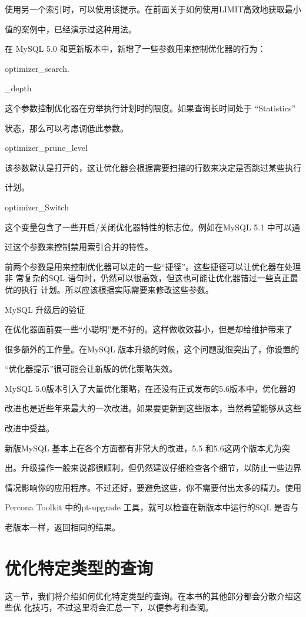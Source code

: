 使用另一个索引时，可以使用该提示。在前面关于如何使用LIMIT高效地获取最小

值的案例中，已经演示过这种用法。

在 MySQL 5.0 和更新版本中，新增了一些参数用来控制优化器的行为：

optimizer\_search.

\_depth

这个参数控制优化器在穷举执行计划时的限度。如果查询长时间处于 “Statistics”

状态，那么可以考虑调低此参数。

optimizer\_prune\_level

该参数默认是打开的，这让优化器会根据需要扫描的行数来决定是否跳过某些执行

计划。

optimizer\_Switch

这个变量包含了一些开启/关闭优化器特性的标志位。例如在MySQL 5.1 中可以通

过这个参数来控制禁用索引合并的特性。

前两个参数是用来控制优化器可以走的一些“捷径”。这些捷径可以让优化器在处理非
常复杂的SQL 语句时，仍然可以很高效，但这也可能让优化器错过一些真正最优的执行
计划。所以应该根据实际需要来修改这些参数。

MySQL 升级后的验证

在优化器面前耍一些“小聪明”是不好的。这样做收效甚小，但是却给维护带来了

很多额外的工作量。在MySQL 版本升级的时候，这个问题就很突出了，你设置的

“优化器提示”很可能会让新版的优化策略失效。

MySQL 5.0版本引入了大量优化策略，在还没有正式发布的5.6版本中，优化器的

改进也是近些年来最大的一次改进。如果要更新到这些版本，当然希望能够从这些

改进中受益。

新版MySQL 基本上在各个方面都有非常大的改进，5.5 和5.6这两个版本尤为突

出。升级操作一般来说都很顺利，但仍然建议仔细检查各个细节，以防止一些边界

情况影响你的应用程序。不过还好，要避免这些，你不需要付出太多的精力。使用

Percona Toolkit 中的pt-upgrade 工具，就可以检查在新版本中运行的SQL 是否与

老版本一样，返回相同的结果。

\section{优化特定类型的查询}
这一节，我们将介绍如何优化特定类型的查询。在本书的其他部分都会分散介绍这些优
化技巧，不过这里将会汇总一下，以便参考和查阅。

